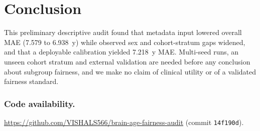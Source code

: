 \documentclass[runningheads]{llncs}
\begin{document}
\section{Conclusion}
This preliminary descriptive audit found that metadata input lowered overall MAE (7.579 to 6.938~y) while observed sex and cohort-stratum gaps widened, and that a deployable calibration yielded 7.218~y MAE. Multi-seed runs, an unseen cohort stratum and external validation are needed before any conclusion about subgroup fairness, and we make no claim of clinical utility or of a validated fairness standard.

\subsubsection*{Code availability.} \url{https://github.com/VISHALS566/brain-age-fairness-audit} (commit \texttt{14f190d}).
\end{document}

